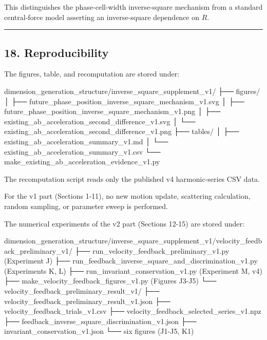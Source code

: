 \documentclass[
  a4paper,
]{article}
\newenvironment{Shaded}{}{}
\newcommand{\NormalTok}[1]{#1}
\begin{document}
This distinguishes the phase-cell-width inverse-square mechanism from a
standard central-force model asserting an inverse-square dependence on
\(R\).

\begin{center}\rule{0.5\linewidth}{0.5pt}\end{center}

\subsection{18. Reproducibility}\label{reproducibility}

The figures, table, and recomputation are stored under:

\begin{Shaded}
\begin{Highlighting}[]
\NormalTok{dimension\_generation\_structure/inverse\_square\_supplement\_v1/}
\NormalTok{├── figures/}
\NormalTok{│   ├── future\_phase\_position\_inverse\_square\_mechanism\_v1.svg}
\NormalTok{│   ├── future\_phase\_position\_inverse\_square\_mechanism\_v1.png}
\NormalTok{│   ├── existing\_ab\_acceleration\_second\_difference\_v1.svg}
\NormalTok{│   └── existing\_ab\_acceleration\_second\_difference\_v1.png}
\NormalTok{├── tables/}
\NormalTok{│   ├── existing\_ab\_acceleration\_summary\_v1.md}
\NormalTok{│   └── existing\_ab\_acceleration\_summary\_v1.csv}
\NormalTok{└── make\_existing\_ab\_acceleration\_evidence\_v1.py}
\end{Highlighting}
\end{Shaded}

The recomputation script reads only the published v4 harmonic-series CSV
data.

For the v1 part (Sections 1-11), no new motion update, scattering
calculation, random sampling, or parameter sweep is performed.

The numerical experiments of the v2 part (Sections 12-15) are stored
under:

\begin{Shaded}
\begin{Highlighting}[]
\NormalTok{dimension\_generation\_structure/inverse\_square\_supplement\_v1/velocity\_feedback\_preliminary\_v1/}
\NormalTok{├── run\_velocity\_feedback\_preliminary\_v1.py          (Experiment J)}
\NormalTok{├── run\_feedback\_inverse\_square\_and\_discrimination\_v1.py (Experiments K, L)}
\NormalTok{├── run\_invariant\_conservation\_v1.py                 (Experiment M, v4)}
\NormalTok{├── make\_velocity\_feedback\_figures\_v1.py             (Figures J3{-}J5)}
\NormalTok{└── velocity\_feedback\_preliminary\_result\_v1/}
\NormalTok{    ├── velocity\_feedback\_preliminary\_result\_v1.json}
\NormalTok{    ├── velocity\_feedback\_trials\_v1.csv}
\NormalTok{    ├── velocity\_feedback\_selected\_series\_v1.npz}
\NormalTok{    ├── feedback\_inverse\_square\_discrimination\_v1.json}
\NormalTok{    ├── invariant\_conservation\_v1.json}
\NormalTok{    └── six figures (J1{-}J5, K1)}
\end{Highlighting}
\end{Shaded}
\end{document}
